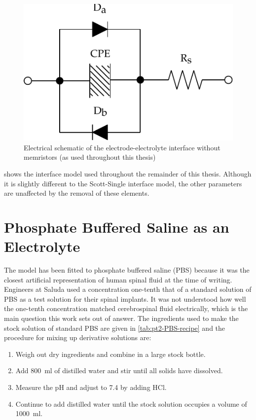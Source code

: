     \begin{figure}
      \centering
      \includegraphics{content/pt2/07-InterfaceModel/graphics/interfaceSchematic_noMemristive}
      \caption{\label{fig:pt2-interfaceSchematic_noMemristive}Electrical schematic of the electrode-electrolyte interface without memristors (as used throughout this thesis)}
    \end{figure}

     shows the interface model used throughout the remainder of this thesis.
    Although it is slightly different to the Scott-Single interface model, the other parameters are unaffected by the removal of these elements.



\section{Phosphate Buffered Saline as an Electrolyte}


  The model has been fitted to phosphate buffered saline (PBS) because it was the closest artificial representation of human spinal fluid at the time of writing.
  Engineers at Saluda used a concentration one-tenth that of a standard solution of PBS as a test solution for their spinal implants.
  It was not understood how well the one-tenth concentration matched cerebrospinal fluid electrically, which is the main question this work sets out of answer.
  The ingredients used to make the stock solution of standard PBS are given in \cref{tab:pt2-PBS-recipe} and the procedure for mixing up derivative solutions are:
  \begin{enumerate}
    \item Weigh out dry ingredients and combine in a large stock bottle.
    \item Add \SI{800}{\milli\litre} of distilled water and stir until all solids have dissolved.
    \item Measure the pH and adjust to 7.4 by adding HCl.
    \item Continue to add distilled water until the stock solution occupies a volume of \SI{1000}{\milli\litre}.
  \end{enumerate}

